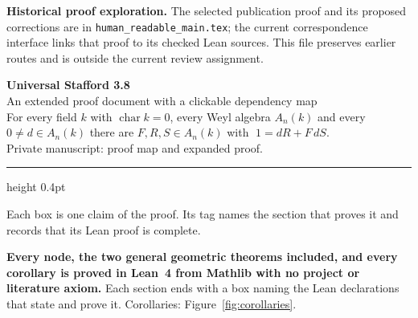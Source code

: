 \documentclass[11pt]{article}
\theoremstyle{plain}
\theoremstyle{definition}
\theoremstyle{remark}
\theoremstyle{plain}
\begin{document}
\noindent\textbf{Historical proof exploration.} The selected publication proof and its proposed corrections are in \texttt{human\_readable\_main.tex}; the current correspondence interface links that proof to its checked Lean sources. This file preserves earlier routes and is outside the current review assignment.

\pagestyle{plain}

\begin{center}
  {\LARGE\bfseries Universal Stafford 3.8}\\[3pt]
  {\large An extended proof document with a clickable dependency map}\\[7pt]
  {\normalsize For every field $k$ with $\operatorname{char}k=0$, every Weyl
   algebra $A_n(k)$ and every $0\neq d\in A_n(k)$ there are $F,R,S\in A_n(k)$
   with $\;1=dR+F\,dS$.}\\[8pt]
  {\footnotesize Private manuscript: proof map and expanded proof.}
\end{center}

\vspace{0.6ex}
\hrule height 0.4pt
\vspace{0.8ex}

{\footnotesize
Each box is one claim of the proof. Its tag names the section that proves it
and records that its Lean proof is complete.
\par\vspace{0.35ex}
\textbf{Every node, the two general geometric theorems included, and every
corollary is proved in Lean~4 from Mathlib with no project or literature
axiom.} Each section ends with a box naming the Lean declarations that state
and prove it. Corollaries: Figure~\ref{fig:corollaries}.
\par}

\vspace{0.4ex}
\end{document}
